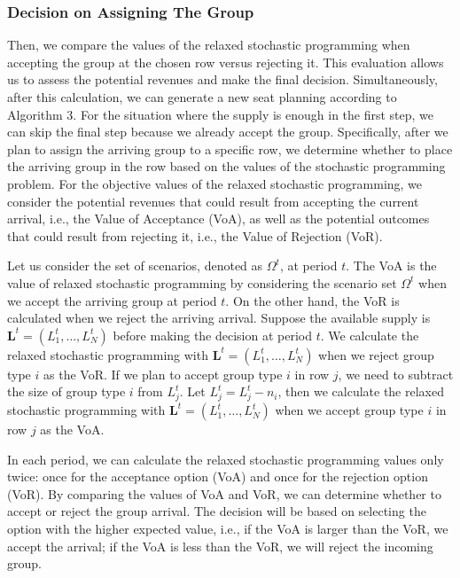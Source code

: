 

\subsubsection*{Decision on Assigning The Group}
Then, we compare the values of the relaxed stochastic programming when accepting the group at the chosen row versus rejecting it. This evaluation allows us to assess the potential revenues and make the final decision. Simultaneously, after this calculation, we can generate a new seat planning according to Algorithm 3. For the situation where the supply is enough in the first step, we can skip the final step because we already accept the group. Specifically, after we plan to assign the arriving group to a specific row, we determine whether to place the arriving group in the row based on the values of the stochastic programming problem. For the objective values of the relaxed stochastic programming, we consider the potential revenues that could result from accepting the current arrival, i.e., the Value of Acceptance (VoA), as well as the potential outcomes that could result from rejecting it, i.e., the Value of Rejection (VoR). 

Let us consider the set of scenarios, denoted as $\Omega^{t}$, at period $t$. The VoA is the value of 
relaxed stochastic programming by considering the scenario set $\Omega^{t}$ when we accept the arriving group at period $t$. On the other hand, the VoR is calculated when we reject the arriving arrival. Suppose the available supply is $\mathbf{L}^{t} = (L_1^{t}, \ldots, L_N^{t})$ before making the decision at period $t$. We calculate the relaxed stochastic programming with $\mathbf{L}^{t}= (L_1^{t}, \ldots, L_N^{t})$ when we reject group type $i$ as the VoR. If we plan to accept group type $i$ in row $j$, we need to subtract the size of group type $i$ from $L_j^{t}$. Let $L_j^{t} = L_j^{t} - n_{i}$, then we calculate the relaxed stochastic programming with $\mathbf{L}^{t}= (L_1^{t}, \ldots, L_N^{t})$ when we accept group type $i$ in row $j$ as the VoA.

In each period, we can calculate the relaxed stochastic programming values only twice: once for the acceptance option (VoA) and once for the rejection option (VoR). By comparing the values of VoA and VoR, we can determine whether to accept or reject the group arrival. The decision will be based on selecting the option with the higher expected value, i.e., if the VoA is larger than the VoR, we accept the arrival; if the VoA is less than the VoR, we will reject the incoming group.

